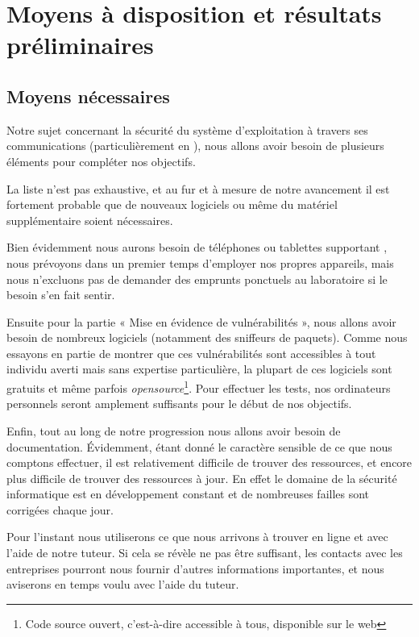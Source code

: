 \documentclass[a4paper, 12pt,twoside]{article}
\begin{document}
	\section{Moyens à disposition et résultats préliminaires}
	
		\subsection{Moyens nécessaires}

		Notre sujet concernant la sécurité du système d'exploitation \Android{} à travers ses communications (particulièrement en \wifi{}), nous allons avoir besoin de plusieurs éléments pour compléter nos objectifs.
		
		La liste n'est pas exhaustive, et au fur et à mesure de notre avancement il est fortement probable que de nouveaux logiciels ou même du matériel supplémentaire soient nécessaires.
		
		Bien évidemment nous aurons besoin de téléphones ou tablettes supportant \Android{}, nous prévoyons dans un premier temps d'employer nos propres appareils, mais nous n'excluons pas de demander des emprunts ponctuels au laboratoire si le besoin s'en fait sentir.
		
		Ensuite pour la partie «  Mise en évidence de vulnérabilités  », nous allons avoir besoin de nombreux logiciels (notamment des sniffeurs de paquets). Comme nous essayons en partie de montrer que ces vulnérabilités sont accessibles à tout individu averti mais sans expertise particulière, la plupart de ces logiciels sont gratuits et même parfois \emph{opensource}\footnote{Code source ouvert,  c'est-à-dire accessible à tous, disponible sur le web}. Pour effectuer les tests, nos ordinateurs personnels seront amplement suffisants pour le début de nos objectifs.
		
		Enfin, tout au long de notre progression nous allons avoir besoin de documentation. Évidemment, étant donné le caractère sensible de ce que nous comptons effectuer, il est relativement difficile de trouver des ressources, et encore plus difficile de trouver des ressources à jour. En effet le domaine de la sécurité informatique est en développement constant et de nombreuses failles sont corrigées chaque jour.

		Pour l'instant nous utiliserons ce que nous arrivons à trouver en ligne et avec l'aide de notre tuteur. Si cela se révèle ne pas être suffisant,  les contacts avec les entreprises pourront nous fournir d'autres informations importantes, et nous aviserons en temps voulu avec l'aide du tuteur.
\end{document}
